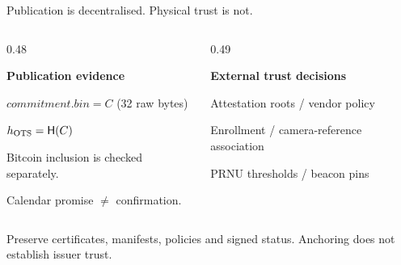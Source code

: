\begin{frame}[noframenumbering]{Publication is decentralised. Physical trust is not.}
\begin{columns}[T,onlytextwidth]
\begin{column}{0.48\textwidth}
\begin{pitchcard}
\textbf{Publication evidence}\par\vspace{0.2cm}
$\mathit{commitment.bin}=C$ (32 raw bytes)\par
$h_{\rm OTS}=\mathsf H(C)$\par\vspace{0.2cm}
Bitcoin inclusion is checked separately.\par
Calendar promise $\ne$ confirmation.
\end{pitchcard}
\end{column}
\begin{column}{0.49\textwidth}
\begin{pitchcard}
\textbf{External trust decisions}\par\vspace{0.2cm}
Attestation roots / vendor policy\par
Enrollment / camera-reference association\par
PRNU thresholds / beacon pins
\end{pitchcard}
\end{column}
\end{columns}
\vspace{0.3cm}
Preserve certificates, manifests, policies and signed status. Anchoring does not establish issuer trust.
\vfill
{}
\end{frame}


